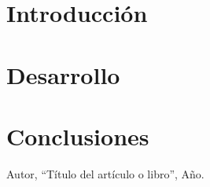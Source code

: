 \documentclass[11pt]{report} %
\begin{document}
\chapter{Introducción} %

\chapter{Desarrollo} %

\chapter{Conclusiones} %

\begin{thebibliography}{9}
     Autor, ``Título del artículo o libro'', Año. %
\end{thebibliography}
\end{document}
